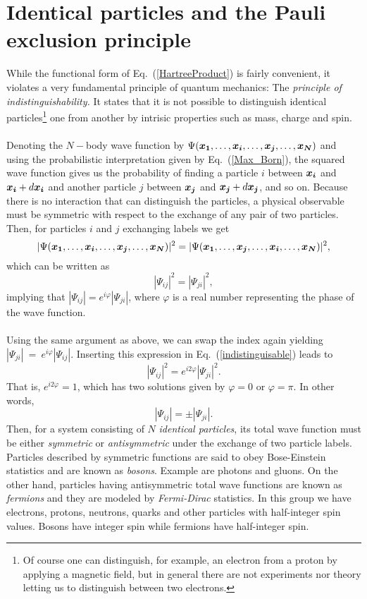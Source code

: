\section{Identical particles and the Pauli exclusion principle}\label{PauliPrinciple}
While the functional form  of Eq.~(\ref{HartreeProduct}) is fairly convenient, it violates a very fundamental principle of quantum mechanics: The \emph{principle of indistinguishability.} It states that it is not possible to distinguish identical particles\footnote{Of course one can distinguish, for example, an electron from a proton by applying a magnetic field, but in general there are not experiments nor theory letting us to distinguish between two electrons.} one from another by intrisic properties such as mass, charge and spin. \\
\\
Denoting the $N-$body wave function by $\Psi(\boldsymbol{x_1}, \ldots, \boldsymbol{x_i}, \ldots, \boldsymbol{x_j}, \ldots, \boldsymbol{x_N})$ and using the probabilistic interpretation  given by Eq.~(\ref{Max_Born}), the squared wave function gives 
us the probability of finding a particle $i$ between $\boldsymbol{x_i}$ and $\boldsymbol{x_i} + d\boldsymbol{x_i}$ and another particle $j$  between $\boldsymbol{x_j}$ and $\boldsymbol{x_j} + d\boldsymbol{x_j}$, and so on. Because there is no interaction that can distinguish the particles, a physical observable must be symmetric with respect to the exchange of any pair of two particles. Then, for particles $i$ and $j$ exchanging labels we get
$$ |\Psi(\boldsymbol{x_1}, \ldots, \boldsymbol{x_i}, \ldots, \boldsymbol{x_j}, \ldots, \boldsymbol{x_N})|^2 = |\Psi(\boldsymbol{x_1}, \ldots, \boldsymbol{x_j}, \ldots, \boldsymbol{x_i}, \ldots, \boldsymbol{x_N})|^2,$$
which can be written as
\begin{equation}\label{indistinguisable}
 |\Psi_{ij}|^2 = |\Psi_{ji}|^2,
\end{equation}
implying that $|\Psi_{ij}| = e^{i \varphi}|\Psi_{ji}|$, where $\varphi$ is a real number representing the phase of the wave function. \\
\\
Using the same argument as above, we can swap the index again yielding $|\Psi_{ji}|~=~e^{i \varphi}|\Psi_{ij}|$. Inserting this expression in  Eq.~(\ref{indistinguisable}) leads to $$|\Psi_{ij}|^2 = e^{i 2 \varphi}|\Psi_{ji}|^2.$$
That is, $e^{i 2 \varphi} = 1$, which has two solutions given by $\varphi = 0$ or $\varphi = \pi$. In other words, 
$$|\Psi_{ij}| = \pm|\Psi_{ji}|.$$
Then, for a system consisting of $N$ \emph{identical particles}, its total wave function must be either \emph{symmetric} or \emph{antisymmetric} under the exchange of two particle labels. Particles described by symmetric functions are said to obey Bose-Einstein statistics and are known as \emph{bosons}. Example are photons and gluons. On the other hand, particles having antisymmetric total wave functions are known as \emph{fermions} and they are modeled by \emph{Fermi-Dirac} statistics. In this group we have electrons, protons, neutrons, quarks and other particles with half-integer spin values. Bosons have integer spin while fermions have half-integer spin.\\
